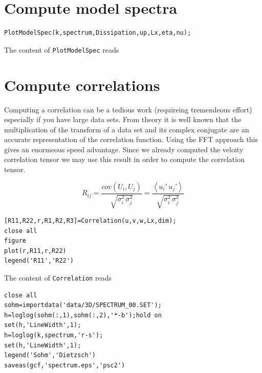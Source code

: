 \documentclass[preprint,12pt,ntfdMod]{elsarticle}
\begin{document}
\section{Compute model spectra}

\begin{lstlisting}
PlotModelSpec(k,spectrum,Dissipation,up,Lx,eta,nu);
\end{lstlisting}
\begin{par}

The content of \verb|PlotModelSpec| reads


\end{par} \vspace{1em}


\section{Compute correlations}

\begin{par}
Computing a correlation can be a tedious work (requireing tremendeous effort) especially if you have large data sets. From theory it is well known that the multiplication of the transform of a data set and its complex conjugate are an accurate representation of the correlation function. Using the FFT approach this gives an enormeous speed advantage. Since we already computed the veloity correlation tensor we may use this result in order to compute the correlation tensor.
\end{par} \vspace{1em}
\begin{par}

  \begin{equation}
      R_{ij} = \frac{cov(U_i,U_j)}{\sqrt{\sigma_i^2\,\sigma_j^2}}
             = \frac{\left<u_i'\,u_j'\right>}{\sqrt{\sigma_i^2\,\sigma_j^2}}
  \end{equation}

\end{par} \vspace{1em}
\begin{lstlisting}
[R11,R22,r,R1,R2,R3]=Correlation(u,v,w,Lx,dim);
close all
figure
plot(r,R11,r,R22)
legend('R11','R22')
\end{lstlisting}
\begin{par}

The content of \verb|Correlation| reads


\end{par} \vspace{1em}
\begin{lstlisting}
close all
sohm=importdata('data/3D/SPECTRUM_00.SET');
h=loglog(sohm(:,1),sohm(:,2),'*-b');hold on
set(h,'LineWidth',1);
h=loglog(k,spectrum,'r-s');
set(h,'LineWidth',1);
legend('Sohm','Dietzsch')
saveas(gcf,'spectrum.eps','psc2')
\end{lstlisting}
\end{document}

